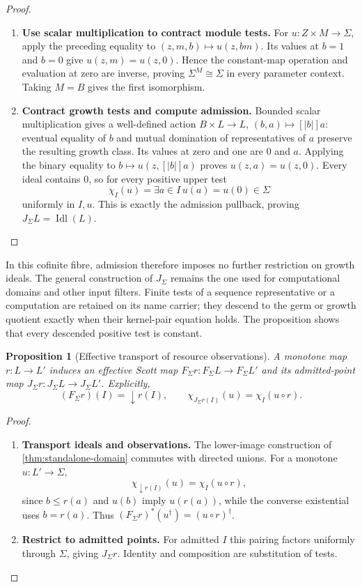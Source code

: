 \documentclass[11pt,a4paper]{article}
\numberwithin{algorithm}{section}
\numberwithin{equation}{section}
\newtheorem{proposition}[proposition]{Proposition}
\theoremstyle{definition}
\theoremstyle{remark}
\theoremstyle{plain}
\newcommand{\Idl}{\operatorname{Idl}}
\newcommand{\J}{J_{\Sigma}}
\newcommand{\F}{F_{\Sigma}}
\newcommand{\abs}[1]{\lvert #1\rvert}
\theoremstyle{definition}
\theoremstyle{plain}
\begin{document}
\begin{proof}
\begin{enumerate}[leftmargin=*,align=left]
\item \textbf{Use scalar multiplication to contract module tests.}
For $u:Z\times M\to\Sigma$, apply the preceding equality to
$(z,m,b)\mapsto u(z,bm)$. Its values at $b=1$ and $b=0$ give
$u(z,m)=u(z,0)$. Hence the constant-map operation and evaluation
at zero are inverse, proving $\Sigma^M\cong\Sigma$ in every
parameter context. Taking $M=B$ gives the first isomorphism.

\item \textbf{Contract growth tests and compute admission.}
Bounded scalar multiplication gives a well-defined action
$B\times L\to L$, $(b,a)\mapsto[\abs b]a$:
eventual equality of $b$ and mutual domination of representatives
of $a$ preserve the resulting growth class. Its values at zero
and one are $0$ and $a$. Applying the binary equality to
$b\mapsto u(z,[\abs b]a)$ proves $u(z,a)=u(z,0)$.
Every ideal contains $0$, so for every positive upper test
\[
 \chi_I(u)=\exists a\in I\,u(a)=u(0)\in\Sigma
\]
uniformly in $I,u$. This is exactly the admission pullback,
proving $\J L=\Idl(L)$.
\end{enumerate}
\end{proof}

In this cofinite fibre, admission therefore imposes no further
restriction on growth ideals. The general construction of $\J$
remains the one used for computational domains and other input
filters. Finite tests of a sequence representative or a computation
are retained on its name carrier; they descend to the germ or
growth quotient exactly when their kernel-pair equation holds.
The proposition shows that every descended positive test is constant.


\begin{proposition}[Effective transport of resource observations]
\label{prop:effective-resource-transport}
A monotone map $r:L\to L'$ induces an effective Scott map
$\F r:\F L\to\F L'$ and its admitted-point map
$\J r:\J L\to\J L'$. Explicitly,
\[
 (\F r)(I)=\downarrow r(I),\qquad
 \chi_{\J r(I)}(u)=\chi_I(u\circ r).
\]
\end{proposition}
\begin{proof}\leavevmode
\begin{enumerate}[leftmargin=*,align=left]
\item \textbf{Transport ideals and observations.}
The lower-image construction of \cref{thm:standalone-domain}
commutes with directed unions. For a monotone $u:L'\to\Sigma$,
\[
 \chi_{\downarrow r(I)}(u)=\chi_I(u\circ r),
\]
since $b\le r(a)$ and $u(b)$ imply $u(r(a))$, while the converse
existential uses $b=r(a)$. Thus $(\F r)^*(u^\dagger)=(u\circ r)^\dagger$.

\item \textbf{Restrict to admitted points.}
For admitted $I$ this pairing factors uniformly through $\Sigma$,
giving $\J r$. Identity and composition are substitution of tests.
\end{enumerate}
\end{proof}
\end{document}
